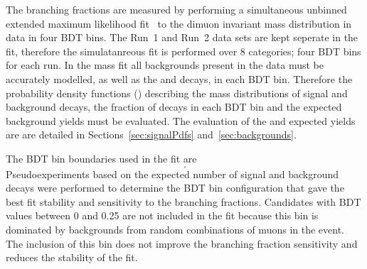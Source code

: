 The branching fractions are measured by performing a simultaneous unbinned extended maximum likelihood fit~\cite{Brun:1997pa,James:1975dr} to the dimuon invariant mass distribution in data in four BDT bins. The Run~1 and Run~2 data sets are kept seperate in the fit, therefore the simulatanreous fit is performed over 8 categories; four BDT bins for each run.
In the mass fit all backgrounds present in the data must be accurately modelled, as well as the \bdmumu and \bsmumu decays, in each BDT bin. 
Therefore the probability density functions (\pdfs) describing the mass distributions of signal and background decays, the fraction of \bmumu decays in each BDT bin and the expected background yields must be evaluated. The evaluation of the \pdfs and expected yields are are detailed in Sections~\ref{sec:signalPdfs} and~\ref{sec:backgrounds}.

The BDT bin boundaries used in the fit are
\begin{equation}
[0.25, 0.4, 0.5, 0.6, 1.0].
\label{eq:BDTbins}
\end{equation}
Pseudoexperiments based on the expected number of signal and background decays were performed to determine the BDT bin configuration that gave the best fit stability and sensitivity to the \bmumu branching fractions.
Candidates with BDT values between 0 and 0.25 are not included in the fit because this bin is dominated by backgrounds from random combinations of muons in the event. The inclusion of this bin does not improve the branching fraction sensitivity and reduces the stability of the fit. %

